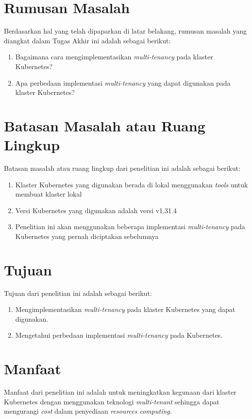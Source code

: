 \section{Rumusan Masalah}

Berdasarkan hal yang telah dipaparkan di latar belakang, rumusan masalah
yang diangkat dalam Tugas Akhir ini adalah sebagai berikut:
\begin{enumerate}[itemsep=-0.2cm, topsep=-0.3cm]
  \item{Bagaimana cara mengimplementasikan \emph{multi-tenancy} pada klaster Kubernetes?}
  \item{Apa perbedaan implementasi \emph{multi-tenancy} yang dapat digunakan pada klaster Kubernetes?}
\end{enumerate}

\section{Batasan Masalah atau Ruang Lingkup}

Batasan masalah atau ruang lingkup dari penelitian ini adalah sebagai berikut:
\begin{enumerate}[itemsep=-0.2cm, topsep=-0.3cm]
  \item{Klaster Kubernetes yang digunakan berada di lokal menggunakan \emph{tools} untuk membuat klaster lokal}
  \item{Versi Kubernetes yang digunakan adalah versi v1.31.4}
  \item{Penelitian ini akan menggunakan beberapa implementasi \emph{multi-tenancy} pada Kubernetes yang pernah diciptakan sebelumnya}
\end{enumerate}

\section{Tujuan}

Tujuan dari penelitian ini adalah sebagai berikut:
\begin{enumerate}[itemsep=-0.2cm, topsep=-0.3cm]
  \item{Mengimplementasikan \emph{multi-tenancy} pada klaster Kubernetes yang dapat digunakan.}
  \item{Mengetahui perbedaan implementasi \emph{multi-tenancy} pada Kubernetes.}
\end{enumerate}

\section{Manfaat}

Manfaat dari penelitian ini adalah untuk meningkatkan kegunaan dari
klaster Kubernetes dengan menggunakan teknologi \emph{multi-tenant}
sehingga dapat mengurangi \emph{cost} dalam penyediaan
\emph{resources computing}.
